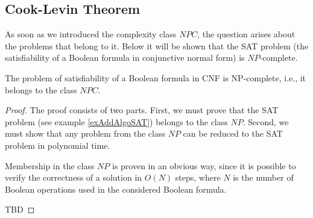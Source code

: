 \subsection{Cook-Levin Theorem}

As soon as we introduced the complexity class $NPC$, the question arises about the problems that belong to it. Below it will be shown that the SAT problem (the satisfiability of a Boolean formula in conjunctive normal form) is $NP$-complete.

\begin{theorem}
The problem of satisfiability of a Boolean formula in CNF is NP-complete, i.e., it belongs to the class $NPC$.
\label{theoremAddAlgoCookTheorem}
\end{theorem}

\begin{proof}
  The proof consists of two parts. First, we must prove that the SAT problem (see example \ref{exAddAlgoSAT}) belongs to the class $NP$. Second, we must show that any problem from the class $NP$ can be reduced to the SAT problem in polynomial time.
  
  Membership in the class $NP$ is proven in an obvious way, since it is possible to verify the correctness of a solution in $O\left(N\right)$ steps, where $N$ is the number of Boolean operations used in the considered Boolean formula.

 
  TBD
\end{proof}